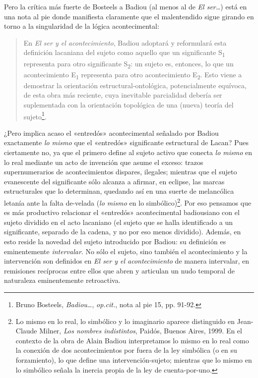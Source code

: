 Pero la crítica más fuerte de Bosteels a Badiou (al menos al de \emph{El ser\ldots{}}) está en una nota al pie donde manifiesta claramente que el malentendido sigue girando en torno a la singularidad de la lógica acontecimental:

\begin{quote}
En \emph{El ser y el acontecimiento}, Badiou adoptará y reformulará esta definición lacaniana del sujeto como aquello que un significante S\textsubscript{1} representa para otro significante S\textsubscript{2}: un sujeto es, entonces, lo que un acontecimiento E\textsubscript{1} representa para otro acontecimiento E\textsubscript{2}. Esto viene a demostrar la orientación estructural-ontológica, potencialmente equívoca, de esta obra más reciente, cuya inevitable parcialidad debería ser suplementada con la orientación topológica de una (nueva) teoría del sujeto\footnote{Bruno Bosteels, \emph{Badiou\ldots{}}, \emph{op.cit.}, nota al pie 15, pp. 91-92.}.
\end{quote}

¿Pero implica acaso el «entredós» acontecimental señalado por Badiou exactamente \emph{lo mismo} que el «entredós» significante estructural de Lacan? Pues ciertamente no, ya que el primero define al sujeto activo que conecta \emph{lo mismo} en lo real mediante un acto de invención que asume el exceso: trazos supernumerarios de acontecimientos dispares, ilegales; mientras que el sujeto evanescente del significante sólo alcanza a afirmar, en eclipse, las marcas estructurales que lo determinan, quedando así en una suerte de melancólica letanía ante la falta de-velada (\emph{lo mismo} en lo simbólico)\footnote{Lo mismo en lo real, lo simbólico y lo imaginario aparece distinguido en Jean-Claude Milner, \emph{Los nombres indistintos}, Paidós, Buenos Aires, 1999. En el contexto de la obra de Alain Badiou interpretamos lo mismo en lo real como la conexión de dos acontecimientos por fuera de la ley simbólica (o en su forzamiento), lo que define una intervención-sujeto; mientras que lo mismo en lo simbólico señala la inercia propia de la ley de cuenta-por-uno.}. Por eso pensamos que es más productivo relacionar el «entredós» acontecimental badiousiano con el sujeto dividido en el acto lacaniano (el sujeto que se halla identificado a un significante, separado de la cadena, y no por eso menos dividido). Además, en esto reside la novedad del sujeto introducido por Badiou: su definición es eminentemente \emph{intervalar}. No sólo el sujeto, sino también el acontecimiento y la intervención son definidos en \emph{El ser y el acontecimiento} de manera intervalar, en remisiones recíprocas entre ellos que abren y articulan un nudo temporal de naturaleza eminentemente retroactiva.

